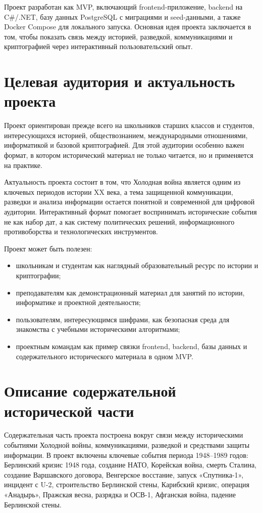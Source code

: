\documentclass[14pt,a4paper]{extarticle}
\begin{document}
Проект разработан как MVP, включающий frontend-приложение, backend на C\#/.NET, базу данных PostgreSQL с миграциями и seed-данными, а также Docker Compose для локального запуска. Основная идея проекта заключается в том, чтобы показать связь между историей, разведкой, коммуникациями и криптографией через интерактивный пользовательский опыт.

\section{Целевая аудитория и актуальность проекта}

Проект ориентирован прежде всего на школьников старших классов и студентов, интересующихся историей, обществознанием, международными отношениями, информатикой и базовой криптографией. Для этой аудитории особенно важен формат, в котором исторический материал не только читается, но и применяется на практике.

Актуальность проекта состоит в том, что Холодная война является одним из ключевых периодов истории XX века, а тема защищенной коммуникации, разведки и анализа информации остается понятной и современной для цифровой аудитории. Интерактивный формат помогает воспринимать исторические события не как набор дат, а как систему политических решений, информационного противоборства и технологических инструментов.

Проект может быть полезен:

\begin{itemize}
  \item школьникам и студентам как наглядный образовательный ресурс по истории и криптографии;
  \item преподавателям как демонстрационный материал для занятий по истории, информатике и проектной деятельности;
  \item пользователям, интересующимся шифрами, как безопасная среда для знакомства с учебными историческими алгоритмами;
  \item проектным командам как пример связки frontend, backend, базы данных и содержательного исторического материала в одном MVP.
\end{itemize}

\section{Описание содержательной исторической части}

Содержательная часть проекта построена вокруг связи между историческими событиями Холодной войны, коммуникациями, разведкой и средствами защиты информации. В проект включены ключевые события периода 1948--1989 годов: Берлинский кризис 1948 года, создание НАТО, Корейская война, смерть Сталина, создание Варшавского договора, Венгерское восстание, запуск «Спутника-1», инцидент с U-2, строительство Берлинской стены, Карибский кризис, операция «Анадырь», Пражская весна, разрядка и ОСВ-1, Афганская война, падение Берлинской стены.
\end{document}
